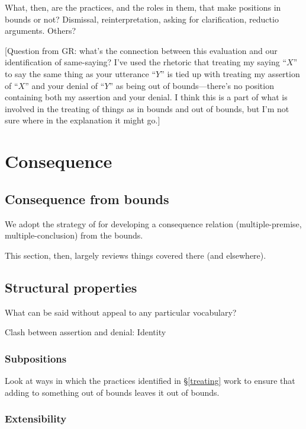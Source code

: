 \documentclass{article}
\begin{document}
What, then, are the practices, and the roles in them, that make positions in bounds or not?
Dismissal, reinterpretation, asking for clarification, reductio arguments. Others? 

[Question from GR: what's the connection between this evaluation and our identification of same-saying? I've used the rhetoric that treating my saying ``$X$'' to say the same thing as your utterance ``$Y$'' is tied up with treating my assertion of ``$X$'' and your denial of ``$Y$'' as being out of bounds---there's no position containing both my assertion and your denial. I think this is a part of what is involved in the treating of things as in bounds and out of bounds, but I'm not sure where in the explanation it might go.]

\section{Consequence} \label{consequence}

\subsection{Consequence from bounds}

We adopt the strategy of \cite{restall:mc} for developing a consequence relation (multiple-premise, multiple-conclusion) from the bounds.

This section, then, largely reviews things covered there (and elsewhere).


\subsection{Structural properties}

What can be said without appeal to any particular vocabulary?

Clash between assertion and denial: Identity


\subsubsection{Subpositions}

Look at ways in which the practices identified in \S\ref{treating} work to ensure that adding to something out of bounds leaves it out of bounds.

\subsubsection{Extensibility} \label{cut}
\end{document}
